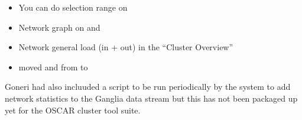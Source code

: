 \begin{itemize}
\item You can  do selection range on 
\item Network graph on  and 
\item Network general load (in + out) in the ``Cluster Overview''
\item moved  and  from
   to 
\end{itemize}
        
Goneri had also incluuded a  script to be run
periodically by the  system to add network statistics to the
Ganglia data stream but this has not been packaged up yet for the
OSCAR cluster tool suite.

